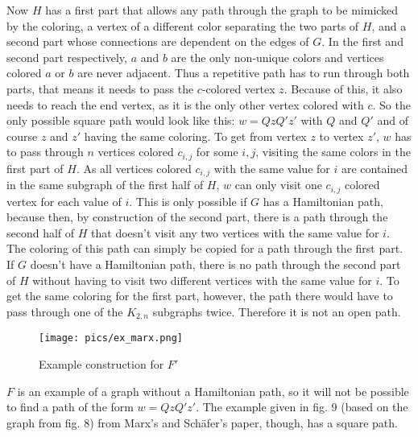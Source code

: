 \documentclass[12pt,a4paper]{article}
\begin{document}
Now $H$ has a first part that allows any path through the graph to be mimicked by the coloring, a vertex of a different color separating the two parts of $H$, and a second part whose connections are dependent on the edges of $G$. In the first and second part respectively, $a$ and $b$ are the only non-unique colors and vertices colored $a$ or $b$ are never adjacent. Thus a repetitive path has to run through both parts, that means it needs to pass the $c$-colored vertex $z$. Because of this, it also needs to reach the end vertex, as it is the only other vertex colored with $c$. So the only possible square path would look like this: $w = QzQ'z'$ with $Q$ and $Q'$ and of course $z$ and $z'$ having the same coloring. To get from vertex $z$ to vertex $z'$, $w$ has to pass through $n$ vertices colored $c_{i,j}$ for some $i,j$, visiting the same colors in the first part of $H$. As all vertices colored $c_{i,j}$ with the same value for $i$ are contained in the same subgraph of the first half of $H$, $w$ can only visit one $c_{i,j}$ colored vertex for each value of $i$. This is only possible if $G$ has a Hamiltonian path, because then, by construction of the second part, there is a path through the second half of $H$ that doesn't visit any two vertices with the same value for $i$. The coloring of this path can simply be copied for a path through the first part. If $G$ doesn't have a Hamiltonian path, there is no path 
through the second part of $H$ without having to visit two different vertices with the same value for $i$. To get the same coloring for the first part, however, the path there would have to pass through one of the $K_{2,n}$ subgraphs twice. Therefore it is not an open path. 
 \begin{figure}[h]
\begin{minipage}[c]{0.3\linewidth}
	
\end{minipage}
\begin{minipage}[c]{0.8\linewidth}
	\texttt{[image: pics/ex\_marx.png]}
\end{minipage}
\begin{minipage}[t]{0.2\linewidth}
	\caption{$F'$}
\end{minipage}
\begin{minipage}[t]{0.8\linewidth}
	\caption{Example construction for $F'$ \citep{Marx2009}}
\end{minipage}
\end{figure}
\newpage
$F$ is an example of a graph without a Hamiltonian path, so it will not be possible to find a path of the form $w = QzQ'z'$. The example given in fig. 9 (based on the graph from fig. 8) from Marx's and Schäfer's paper, though, has a square path.
\end{document}
